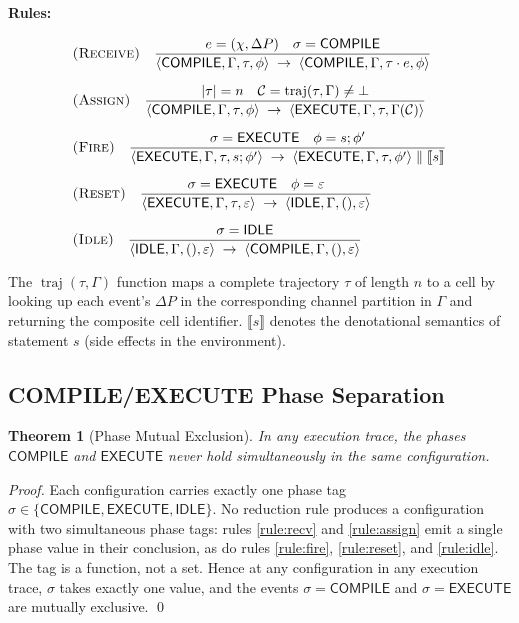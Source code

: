 \documentclass[twocolumn,10pt]{article}
\newtheorem{theorem}{Theorem}[section]
\newcommand{\DP}{\Delta P}          %
\newcommand{\calC}{\mathcal{C}}     %
\newcommand{\llb}{\llbracket}
\newcommand{\rrb}{\rrbracket}
\DeclareMathOperator{\traj}{traj}
\begin{document}
\textbf{Rules:}

\begin{align}
  &\textsc{(Receive)} \quad
  \frac{e = (\chi, \DP) \quad \sigma = \mathsf{COMPILE}}
       {\langle \mathsf{COMPILE},\Gamma,\tau,\phi\rangle
        \;\to\;
        \langle \mathsf{COMPILE},\Gamma,\tau \cdot e,\phi\rangle}
  \label{rule:recv} \\[6pt]
  &\textsc{(Assign)} \quad
  \frac{|\tau| = n \quad \calC = \traj(\tau, \Gamma) \neq \bot}
       {\langle \mathsf{COMPILE},\Gamma,\tau,\phi\rangle
        \;\to\;
        \langle \mathsf{EXECUTE},\Gamma,\tau,\Gamma(\calC)\rangle}
  \label{rule:assign} \\[6pt]
  &\textsc{(Fire)} \quad
  \frac{\sigma = \mathsf{EXECUTE} \quad \phi = s;\phi'}
       {\langle \mathsf{EXECUTE},\Gamma,\tau,s;\phi'\rangle
        \;\to\;
        \langle \mathsf{EXECUTE},\Gamma,\tau,\phi'\rangle \;\|\;
        \llb s \rrb}
  \label{rule:fire} \\[6pt]
  &\textsc{(Reset)} \quad
  \frac{\sigma = \mathsf{EXECUTE} \quad \phi = \varepsilon}
       {\langle \mathsf{EXECUTE},\Gamma,\tau,\varepsilon\rangle
        \;\to\;
        \langle \mathsf{IDLE},\Gamma,(),\varepsilon\rangle}
  \label{rule:reset} \\[6pt]
  &\textsc{(Idle)} \quad
  \frac{\sigma = \mathsf{IDLE}}
       {\langle \mathsf{IDLE},\Gamma,(),\varepsilon\rangle
        \;\to\;
        \langle \mathsf{COMPILE},\Gamma,(),\varepsilon\rangle}
  \label{rule:idle}
\end{align}

The $\traj(\tau, \Gamma)$ function maps a complete trajectory $\tau$
of length $n$ to a cell by looking up each event's $\DP$ in the
corresponding channel partition in $\Gamma$ and returning the
composite cell identifier. $\llb s \rrb$ denotes the denotational
semantics of statement $s$ (side effects in the environment).

\subsection{COMPILE/EXECUTE Phase Separation}

\begin{theorem}[Phase Mutual Exclusion]
\label{thm:phase}
In any execution trace, the phases $\mathsf{COMPILE}$ and
$\mathsf{EXECUTE}$ never hold simultaneously in the same
configuration.
\end{theorem}
\begin{proof}
Each configuration carries exactly one phase tag
$\sigma \in \{\mathsf{COMPILE}, \mathsf{EXECUTE}, \mathsf{IDLE}\}$.
No reduction rule produces a configuration with two simultaneous
phase tags: rules \eqref{rule:recv} and \eqref{rule:assign}
emit a single phase value in their conclusion, as do rules
\eqref{rule:fire}, \eqref{rule:reset}, and \eqref{rule:idle}.
The tag is a function, not a set. Hence at any configuration in any
execution trace, $\sigma$ takes exactly one value, and the events
$\sigma = \mathsf{COMPILE}$ and $\sigma = \mathsf{EXECUTE}$ are
mutually exclusive. \qed
\end{proof}
\end{document}

